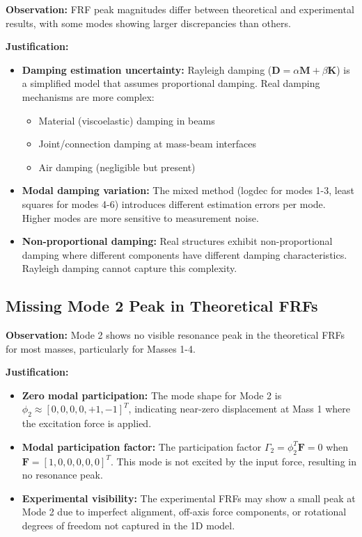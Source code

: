 \documentclass[11pt,a4paper]{article}
\begin{document}
\textbf{Observation:} FRF peak magnitudes differ between theoretical and experimental results, with some modes showing larger discrepancies than others.

\textbf{Justification:}
\begin{itemize}[leftmargin=*]
    \item \textbf{Damping estimation uncertainty:} Rayleigh damping ($\mathbf{D} = \alpha\mathbf{M} + \beta\mathbf{K}$) is a simplified model that assumes proportional damping. Real damping mechanisms are more complex:
    \begin{itemize}
        \item Material (viscoelastic) damping in beams
        \item Joint/connection damping at mass-beam interfaces
        \item Air damping (negligible but present)
    \end{itemize}

    \item \textbf{Modal damping variation:} The mixed method (logdec for modes 1-3, least squares for modes 4-6) introduces different estimation errors per mode. Higher modes are more sensitive to measurement noise.

    \item \textbf{Non-proportional damping:} Real structures exhibit non-proportional damping where different components have different damping characteristics. Rayleigh damping cannot capture this complexity.
\end{itemize}

\subsection{Missing Mode 2 Peak in Theoretical FRFs}

\textbf{Observation:} Mode 2 shows no visible resonance peak in the theoretical FRFs for most masses, particularly for Masses 1-4.

\textbf{Justification:}
\begin{itemize}[leftmargin=*]
    \item \textbf{Zero modal participation:} The mode shape for Mode 2 is $\phi_2 \approx [0, 0, 0, 0, +1, -1]^T$, indicating near-zero displacement at Mass 1 where the excitation force is applied.

    \item \textbf{Modal participation factor:} The participation factor $\Gamma_2 = \phi_2^T \mathbf{F} = 0$ when $\mathbf{F} = [1, 0, 0, 0, 0, 0]^T$. This mode is not excited by the input force, resulting in no resonance peak.

    \item \textbf{Experimental visibility:} The experimental FRFs may show a small peak at Mode 2 due to imperfect alignment, off-axis force components, or rotational degrees of freedom not captured in the 1D model.
\end{itemize}
\end{document}
